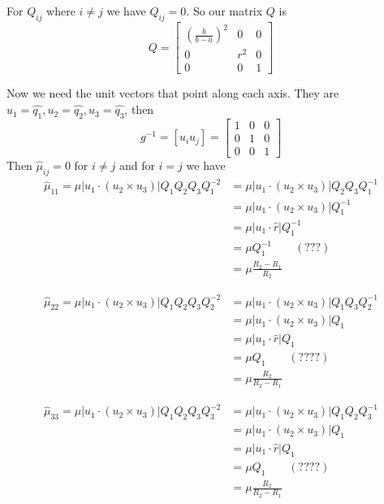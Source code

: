 \documentclass{amsart}
\begin{document}
For $Q_{ij}$ where $i\neq j$ we have $Q_{ij}=0$. So our matrix $Q$ is
\[
  Q=\begin{bmatrix}
    \left(\frac{b}{b-a}\right)^2 & 0 & 0\\
    0 & r^2 & 0\\
    0 & 0 & 1
  \end{bmatrix}
\]

Now we need the unit vectors that point along each axis. They are $u_1=\widehat{q_1},u_2=\widehat{q_2},u_3=\widehat{q_3}$,
then
\[
  g^{-1}=
  [u_iu_j]=
  \begin{bmatrix}
    1 & 0 & 0\\
    0 & 1 & 0\\
    0 & 0 & 1
  \end{bmatrix}
\]
Then $\hat{\mu}_{ij}=0$ for $i\neq j$ and for $i=j$ we have
\begin{align*}
  \hat{\mu}_{11}=\mu|u_1\cdot(u_2\times u_3)|Q_1Q_2Q_3Q_1^{-2}
  &=\mu|u_1\cdot(u_2\times u_3)|Q_2Q_3Q_1^{-1}\\
  &=\mu|u_1\cdot(u_2\times u_3)|Q_1^{-1}\\
  &=\mu|u_1\cdot\hat{r}|Q_1^{-1}\\
  &=\mu Q_1^{-1}\qquad (???)\\
  &=\mu \frac{R_2-R_1}{R_2}
\end{align*}

\begin{align*}
  \hat{\mu}_{22}=\mu|u_1\cdot(u_2\times u_3)|Q_1Q_2Q_3Q_2^{-2}
  &=\mu|u_1\cdot(u_2\times u_3)|Q_1Q_3Q_2^{-1}\\
  &=\mu|u_1\cdot(u_2\times u_3)|Q_1\\
  &=\mu|u_1\cdot\hat{r}|Q_1\\
  &=\mu Q_1\qquad (????)\\
  &=\mu \frac{R_2}{R_2-R_1}
\end{align*}

\begin{align*}
  \hat{\mu}_{33}=\mu|u_1\cdot(u_2\times u_3)|Q_1Q_2Q_3Q_3^{-2}
  &=\mu|u_1\cdot(u_2\times u_3)|Q_1Q_2Q_3^{-1}\\
  &=\mu|u_1\cdot(u_2\times u_3)|Q_1\\
  &=\mu|u_1\cdot\hat{r}|Q_1\\
  &=\mu Q_1\qquad (????)\\
  &=\mu \frac{R_2}{R_2-R_1}
\end{align*}

\end{document}
